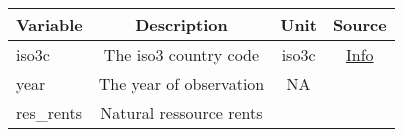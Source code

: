\documentclass[]{article}
\begin{document}
\begin{longtable}[]{@{}lccc@{}}
\toprule
\begin{minipage}[b]{0.14\columnwidth}\raggedright\strut
Variable\strut
\end{minipage} & \begin{minipage}[b]{0.36\columnwidth}\centering\strut
Description\strut
\end{minipage} & \begin{minipage}[b]{0.24\columnwidth}\centering\strut
Unit\strut
\end{minipage} & \begin{minipage}[b]{0.15\columnwidth}\centering\strut
Source\strut
\end{minipage}\tabularnewline
\midrule
\endhead
\begin{minipage}[t]{0.14\columnwidth}\raggedright\strut
iso3c\strut
\end{minipage} & \begin{minipage}[t]{0.36\columnwidth}\centering\strut
The iso3 country code\strut
\end{minipage} & \begin{minipage}[t]{0.24\columnwidth}\centering\strut
iso3c\strut
\end{minipage} & \begin{minipage}[t]{0.15\columnwidth}\centering\strut
\href{https://unstats.un.org/unsd/tradekb/knowledgebase/country-code}{Info}\strut
\end{minipage}\tabularnewline
\begin{minipage}[t]{0.14\columnwidth}\raggedright\strut
year\strut
\end{minipage} & \begin{minipage}[t]{0.36\columnwidth}\centering\strut
The year of observation\strut
\end{minipage} & \begin{minipage}[t]{0.24\columnwidth}\centering\strut
NA\strut
\end{minipage} & \begin{minipage}[t]{0.15\columnwidth}\centering\strut
\strut
\end{minipage}\tabularnewline
\begin{minipage}[t]{0.14\columnwidth}\raggedright\strut
res\_rents\strut
\end{minipage} & \begin{minipage}[t]{0.36\columnwidth}\centering\strut
Natural ressource rents\strut
\end{minipage} & \begin{minipage}[t]{0.24\columnwidth}\centering\strut

\end{minipage}
\end{longtable}
\end{document}
